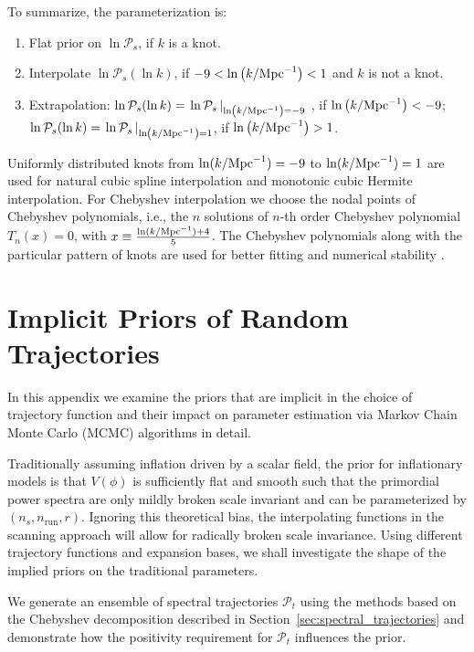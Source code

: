 \documentclass[a4paper,11pt]{article}
\newcommand{\Mpcinv}{{\rm Mpc}^{-1}}
\newcommand{\pscalar}{{\mathcal{P}_s}}
\newcommand{\ptensor}{{\mathcal{P}_t}}
\def \cond[#1][#2]{{\left. {#1}\,\right\vert_{#2}}}
\begin{document}
To summarize, the parameterization is:
\begin{enumerate}
\item Flat prior on $\ln\pscalar$, if $k$ is a knot. 
\item Interpolate $\ln \pscalar (\ln k)$, if $-9<\ln\left(k/\Mpcinv\right)<1$ and $k$ is not a knot.
\item Extrapolation: $\ln \pscalar(\ln k)  =\cond[\ln \pscalar][\ln\left(k/\Mpcinv\right)=-9]$ , if $\ln\left(k/\Mpcinv\right)<-9$;
$\ln \pscalar(\ln k)  =\cond[\ln \pscalar][\ln\left(k/\Mpcinv\right)=1]$, if $\ln\left(k/\Mpcinv\right)>1$.
\end{enumerate}

Uniformly distributed knots from $\ln (k/\Mpcinv) = -9$ to $\ln
(k/\Mpcinv) =1$ are used for natural cubic spline interpolation and
monotonic cubic Hermite interpolation. For Chebyshev interpolation we
choose the nodal points of Chebyshev polynomials, i.e., the $n$
solutions of $n$-th order Chebyshev polynomial $T_n(x)=0$, with
$x\equiv \frac{\ln (k/\Mpcinv) + 4}{5}$. The Chebyshev polynomials
along with the particular pattern of knots are used for better fitting
and numerical stability \cite{CPB}.


\section{Implicit Priors of Random Trajectories}\label{app:interpolation_issues}

In this appendix we examine the priors that are implicit in the choice
of trajectory function and their impact on parameter estimation via
Markov Chain Monte Carlo (MCMC) algorithms in detail.

Traditionally assuming inflation driven by a scalar field, the prior
for inflationary models is that $V(\phi)$ is sufficiently flat and
smooth such that the primordial power spectra are only mildly broken
scale invariant and can be parameterized by $(n_s, n_{\mathrm{run}},
r)$. Ignoring this theoretical bias, the interpolating functions in
the scanning approach will allow for radically broken scale
invariance. Using different trajectory functions and expansion bases,
we shall investigate the shape of the implied priors on the
traditional parameters.

We generate an ensemble of spectral trajectories $\ptensor$ using
the methods based on the Chebyshev decomposition described in
Section~\ref{sec:spectral_trajectories} and demonstrate how the
positivity requirement for $\ptensor$ influences the prior.
\end{document}
